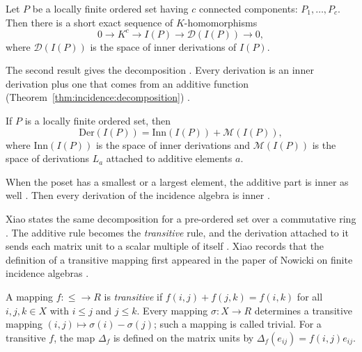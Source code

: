 \begin{theorem}\label{thm:incidence:components}
Let $P$ be a locally finite ordered set having $c$ connected components:
$P_{1},\dots,P_{c}$. Then there is a short exact sequence of $K$-homomorphisms
\begin{equation*}
0\longrightarrow K^{c}\longrightarrow I(P)\longrightarrow
\mathcal D(I(P))\longrightarrow 0,
\end{equation*}
where $\mathcal D(I(P))$ is the space of inner derivations of $I(P)$.
\end{theorem}

The second result gives the decomposition \cite[p.~352]{Baclawski1972}. Every
derivation is an inner derivation plus one that comes from an additive function (Theorem~\ref{thm:incidence:decomposition})
\cite[p.~352]{Baclawski1972}.\begin{theorem}\label{thm:incidence:decomposition}
If $P$ is a locally finite ordered set, then
\begin{equation*}
\mathrm{Der}(I(P))=\mathrm{Inn}(I(P))+\mathcal M(I(P)),
\end{equation*}
where $\mathrm{Inn}(I(P))$ is the space of inner derivations and
$\mathcal M(I(P))$ is the space of derivations $L_{a}$ attached to additive
elements $a$.
\end{theorem}

When the poset has a smallest or a largest element, the additive part is inner as
well \cite[p.~354]{Baclawski1972}. Then every derivation of the incidence algebra is
inner \cite[p.~354]{Baclawski1972}.

Xiao states the same decomposition for a pre-ordered set over a commutative ring
\cite[p.~1362]{Xiao2015}. The additive rule becomes the \emph{transitive} rule, and
the derivation attached to it sends each matrix unit to a scalar multiple of itself
\cite[p.~1362]{Xiao2015}. Xiao records that the definition of a transitive mapping
first appeared in the paper of Nowicki on finite incidence algebras
\cite[Remark~2.4, p.~1362]{Xiao2015}.

\begin{definition}\label{def:incidence:transitive}
A mapping $f\colon{\le}\to R$ is \emph{transitive} if
$f(i,j)+f(j,k)=f(i,k)$ for all $i,j,k\in X$ with $i\le j$ and $j\le k$. Every
mapping $\sigma\colon X\to R$ determines a transitive mapping
$(i,j)\mapsto\sigma(i)-\sigma(j)$; such a mapping is called trivial. For a
transitive $f$, the map $\Delta_{f}$ is defined on the matrix units by
$\Delta_{f}(e_{ij})=f(i,j)e_{ij}$.
\end{definition}

